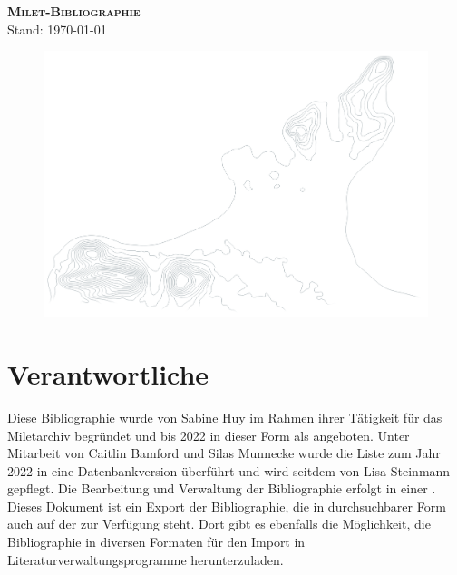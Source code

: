 
\begin{titlepage}
    \vspace*{3cm}
\begin{center}
    {\LARGE \textsc{\textbf{Milet-Bibliographie}}}\\
    
    Stand: \today
\end{center}
\vspace*{3cm}
\begin{figure}[h]
    \includegraphics[width=\textwidth]{../data/figures/Gelaende2.png}
\end{figure}

\end{titlepage}

\thispagestyle{empty}
\section*{Verantwortliche}

Diese Bibliographie wurde von Sabine Huy im Rahmen ihrer Tätigkeit für das Miletarchiv begründet und bis 2022 in dieser Form als  angeboten. Unter Mitarbeit von Caitlin Bamford und Silas Munnecke wurde die Liste zum Jahr 2022 in eine Datenbankversion überführt und wird seitdem von Lisa Steinmann gepflegt. Die Bearbeitung und Verwaltung der Bibliographie erfolgt in einer . Dieses Dokument ist ein Export der Bibliographie, die in durchsuchbarer Form auch auf der  zur Verfügung steht. Dort gibt es ebenfalls die Möglichkeit, die Bibliographie in diversen Formaten für den Import in Literaturverwaltungsprogramme herunterzuladen.\\

